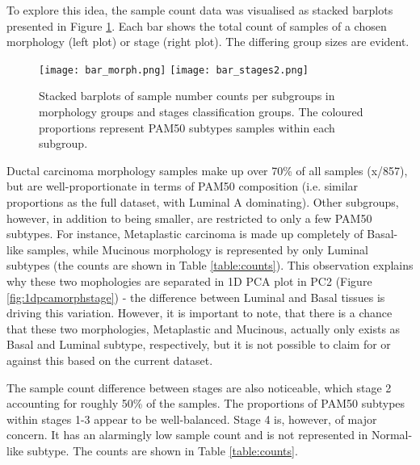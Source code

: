     To explore this idea, the sample count data was visualised as stacked barplots presented in Figure \ref{fig:barms}. Each bar shows the total count of samples of a chosen morphology (left plot) or stage (right plot). The differing group sizes are evident.         
    
       
        \begin{figure}[!h]
        \texttt{[image: bar\_morph.png]}\hfill
        \texttt{[image: bar\_stages2.png]}
        \caption{Stacked barplots of sample number counts per subgroups in morphology groups and stages classification groups. The coloured proportions represent PAM50 subtypes samples within each subgroup.}
        \label{fig:barms}
        \end{figure}
        
    Ductal carcinoma morphology samples make up over 70\% of all samples (x/857), but are well-proportionate in terms of PAM50 composition (i.e. similar proportions as the full dataset, with Luminal A dominating). Other subgroups, however, in addition to being smaller, are restricted to only a few PAM50 subtypes. For instance, Metaplastic carcinoma is made up completely of Basal-like samples, while Mucinous morphology is represented by only Luminal subtypes (the counts are shown in Table \ref{table:counts}). This observation explains why these two mophologies are separated in 1D PCA plot in PC2 (Figure \ref{fig:1dpcamorphstage}) - the difference between Luminal and Basal tissues is driving this variation. However, it is important to note, that there is a chance that these two morphologies, Metaplastic and Mucinous, actually only exists as Basal and Luminal subtype, respectively, but it is not possible to claim for or against this based on the current dataset.    
    
    The sample count difference between stages are also noticeable, which stage 2 accounting for roughly 50\% of the samples. The proportions of PAM50 subtypes within stages 1-3 appear to be well-balanced. Stage 4 is, however, of major concern. It has an alarmingly low sample count and is not represented in Normal-like subtype. The counts are shown in Table \ref{table:counts}.
        
